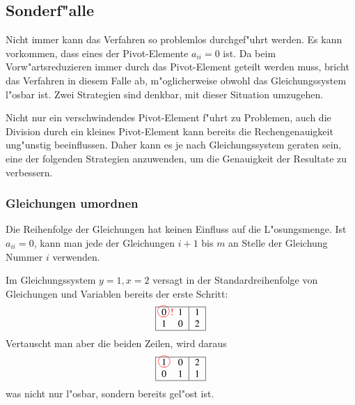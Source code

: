 \subsection{Sonderf"alle}
Nicht immer kann das Verfahren so problemlos durchgef"uhrt werden.
Es kann vorkommen, dass eines der Pivot-Elemente $a_{ii}=0$ ist.
Da beim Vorw"artsreduzieren immer durch das Pivot-Element geteilt
werden muss, bricht das Verfahren in diesem Falle ab, m"oglicherweise
obwohl das Gleichungssystem l"osbar ist.
Zwei Strategien sind denkbar, mit dieser Situation umzugehen.

Nicht nur ein verschwindendes Pivot-Element f"uhrt zu Problemen,
auch die Division durch ein kleines Pivot-Element kann bereits die
Rechengenauigkeit un\-g"unstig beeinflussen.
Daher kann es je nach
Gleichungssystem geraten sein, eine der folgenden Strategien anzuwenden,
um die Genauigkeit der Resultate zu verbessern.
\subsubsection{Gleichungen umordnen}
Die Reihenfolge der Gleichungen hat keinen Einfluss auf die L"osungsmenge.
Ist $a_{ii}=0$, kann man jede der Gleichungen $i+1$ bis $m$ an Stelle
der Gleichung Nummer $i$ verwenden.

\begin{beispiel}[\bf Beispiel] Im Gleichungssystem $y=1, x=2$ versagt
in der Standardreihenfolge von Gleichungen und Variablen bereits der
erste Schritt:
\begin{gather*}
\begin{tabular}{|>{$}c<{$}>{$}c<{$}|>{$}c<{$}|}
\hline
0%
\begin{picture}(0,0)
\color{red}\put(-3,4){\circle{12}}
\put(4,0){!}
\end{picture}%
&1&1\\
1&0&2\\
\hline
\end{tabular}
\end{gather*}
Vertauscht man aber die beiden Zeilen, wird daraus
\begin{gather*}
\begin{tabular}{|>{$}c<{$}>{$}c<{$}|>{$}c<{$}|}
\hline
\begin{picture}(0,0)
\color{red}\put(2.7,4){\circle{12}}
\end{picture}%
1&0&2\\
0&1&1\\
\hline
\end{tabular}
\end{gather*}
was nicht nur l"osbar, sondern bereits gel"ost ist.
\end{beispiel}

